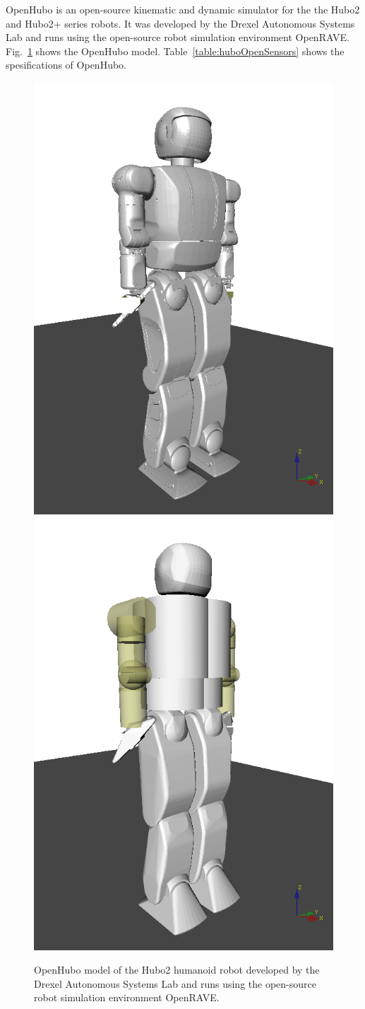 OpenHubo\cite{dlofaro-srm} is an open-source kinematic and dynamic simulator for the the Hubo2 and Hubo2+ series robots.
It was developed by the Drexel Autonomous Systems Lab and runs using the open-source robot simulation environment OpenRAVE\cite{diankovThesis}.
Fig.~\ref{fig:openhubo1} shows the OpenHubo model.
Table~\ref{table:huboOpenSensors} shows the spesifications of OpenHubo.


\begin{figure}[thpb]
  \centering
      \includegraphics[width=0.4\columnwidth]{./pix/hBody.png}\includegraphics[width=0.4\columnwidth]{./pix/hCol.png}
      
\caption{OpenHubo model of the Hubo2 humanoid robot developed by the Drexel Autonomous Systems Lab and runs using the open-source robot simulation environment OpenRAVE\cite{diankovThesis}.}
\label{fig:openhubo1}
\end{figure}


